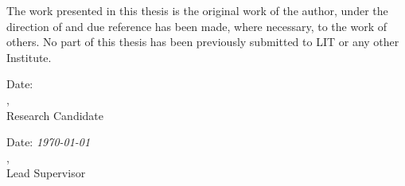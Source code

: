 
\begin{declaration} %


The work presented in this thesis is the original work of the author, under the direction of \@formalsupervisor and due reference has been made, where necessary, to the work of others. No part of this thesis has been previously submitted to LIT or any other Institute.

\vspace{3cm}

\begin{flushleft}
\makebox[4.5cm]{\hrulefill}  \hfill Date: \makebox[2.5cm]{\hrulefill}\\


\textit{\@formalauthor}, \\
Research Candidate \\ 
\end{flushleft}



\vspace{2cm}

\begin{flushleft}
\makebox[4.5cm]{\hrulefill}  \hfill Date: \emph{\today} \\
\textit{\@formalsupervisor},\\
Lead Supervisor \\ 
\end{flushleft}


\end{declaration}


